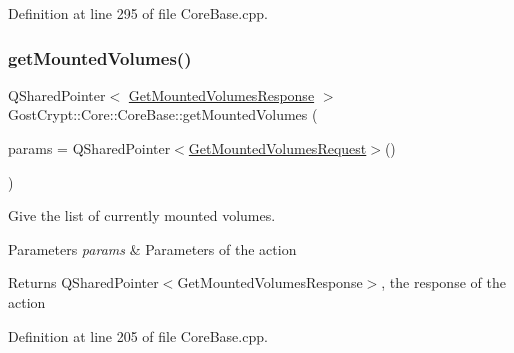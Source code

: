 Definition at line 295 of file Core\+Base.\+cpp.

\mbox{\label{class_gost_crypt_1_1_core_1_1_core_base_a2f6d3f10b68a704690fa1a8843f724dd}} 
\subsubsection{\texorpdfstring{get\+Mounted\+Volumes()}{getMountedVolumes()}}
{\footnotesize\ttfamily Q\+Shared\+Pointer$<$ \hyperlink{struct_gost_crypt_1_1_core_1_1_get_mounted_volumes_response}{Get\+Mounted\+Volumes\+Response} $>$ Gost\+Crypt\+::\+Core\+::\+Core\+Base\+::get\+Mounted\+Volumes (\begin{DoxyParamCaption}\item[{Q\+Shared\+Pointer$<$ \hyperlink{struct_gost_crypt_1_1_core_1_1_get_mounted_volumes_request}{Get\+Mounted\+Volumes\+Request} $>$}]{params = {\ttfamily QSharedPointer$<$\hyperlink{struct_gost_crypt_1_1_core_1_1_get_mounted_volumes_request}{Get\+Mounted\+Volumes\+Request}$>$()} }\end{DoxyParamCaption})\hspace{0.3cm}{\ttfamily [protected]}}



Give the list of currently mounted volumes. 


\begin{DoxyParams}{Parameters}
{\em params} & Parameters of the action \\
\hline
\end{DoxyParams}
\begin{DoxyReturn}{Returns}
Q\+Shared\+Pointer$<$\+Get\+Mounted\+Volumes\+Response$>$, the response of the action 
\end{DoxyReturn}


Definition at line 205 of file Core\+Base.\+cpp.

\mbox{\label{class_gost_crypt_1_1_core_1_1_core_base_a9719fc843a6858f8f4f44f3a9eb60605}} 
